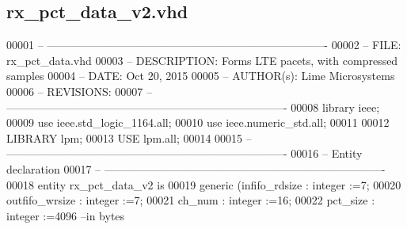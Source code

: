 \subsection{rx\+\_\+pct\+\_\+data\+\_\+v2.\+vhd}
\label{rx__pct__data__v2_8vhd_source}

\begin{DoxyCode}
00001 \textcolor{keyword}{-- ---------------------------------------------------------------------------- }
00002 \textcolor{keyword}{-- FILE:    rx\_pct\_data.vhd}
00003 \textcolor{keyword}{-- DESCRIPTION: Forms LTE pacets, with compressed samples}
00004 \textcolor{keyword}{-- DATE:    Oct 20, 2015}
00005 \textcolor{keyword}{-- AUTHOR(s):   Lime Microsystems}
00006 \textcolor{keyword}{-- REVISIONS:}
00007 \textcolor{keyword}{-- ---------------------------------------------------------------------------- }
00008 \textcolor{vhdlkeyword}{library }\textcolor{keywordflow}{ieee};
00009 \textcolor{vhdlkeyword}{use }ieee.std\_logic\_1164.\textcolor{keywordflow}{all};
00010 \textcolor{vhdlkeyword}{use }ieee.numeric\_std.\textcolor{keywordflow}{all};
00011 
00012 \textcolor{vhdlkeyword}{LIBRARY }\textcolor{keywordflow}{lpm};
00013 \textcolor{vhdlkeyword}{USE }\textcolor{keywordflow}{lpm.all};
00014 
00015 \textcolor{keyword}{-- ----------------------------------------------------------------------------}
00016 \textcolor{keyword}{-- Entity declaration}
00017 \textcolor{keyword}{-- ----------------------------------------------------------------------------}
00018 \textcolor{keywordflow}{entity }rx_pct_data_v2 \textcolor{keywordflow}{is}
00019   \textcolor{keywordflow}{generic} \textcolor{vhdlchar}{(}\textcolor{vhdlchar}{infifo_rdsize}  \textcolor{vhdlchar}{:} \textcolor{comment}{integer} \textcolor{vhdlchar}{:=}\textcolor{vhdllogic}{}\textcolor{vhdllogic}{7};
00020            \textcolor{vhdlchar}{outfifo_wrsize} \textcolor{vhdlchar}{:} \textcolor{comment}{integer} \textcolor{vhdlchar}{:=}\textcolor{vhdllogic}{}\textcolor{vhdllogic}{7};
00021            \textcolor{vhdlchar}{ch_num}         \textcolor{vhdlchar}{:} \textcolor{comment}{integer} \textcolor{vhdlchar}{:=}\textcolor{vhdllogic}{}\textcolor{vhdllogic}{16};
00022            \textcolor{vhdlchar}{pct_size}       \textcolor{vhdlchar}{:} \textcolor{comment}{integer} \textcolor{vhdlchar}{:=}\textcolor{vhdllogic}{}\textcolor{vhdllogic}{4096}\textcolor{keyword}{ --in bytes}

\end{DoxyCode}
